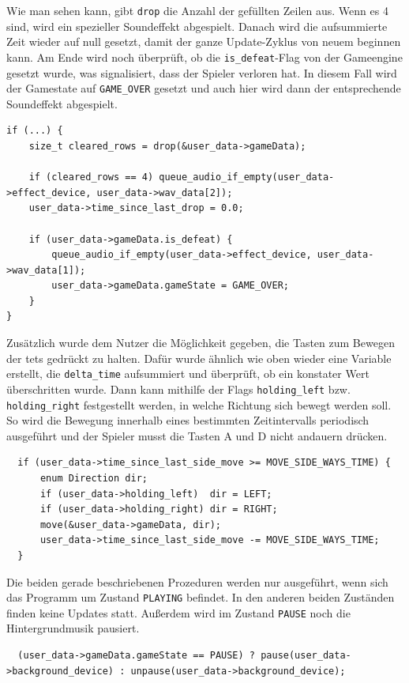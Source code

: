 \documentclass[11pt]{article}
\newcommand{\lstin}[1]{\lstinline[language=C]{#1}}
\begin{document}
Wie man sehen kann, gibt \lstin{drop} die Anzahl der gefüllten Zeilen aus. Wenn es 4 sind, wird ein spezieller Soundeffekt abgespielt.
Danach wird die aufsummierte Zeit wieder auf null gesetzt, damit der ganze Update-Zyklus von neuem beginnen kann.
Am Ende wird noch überprüft, ob die \lstin{is_defeat}-Flag von der Gameengine gesetzt wurde, 
was signalisiert, dass der Spieler verloren hat. In diesem Fall wird der Gamestate auf \lstin{GAME_OVER} 
gesetzt und auch hier wird dann der entsprechende Soundeffekt abgespielt. 

\begin{lstlisting}
if (...) {
    size_t cleared_rows = drop(&user_data->gameData);

    if (cleared_rows == 4) queue_audio_if_empty(user_data->effect_device, user_data->wav_data[2]);
    user_data->time_since_last_drop = 0.0;

    if (user_data->gameData.is_defeat) {
        queue_audio_if_empty(user_data->effect_device, user_data->wav_data[1]);
        user_data->gameData.gameState = GAME_OVER;
    }
}
\end{lstlisting}

Zusätzlich wurde dem Nutzer die Möglichkeit gegeben, die Tasten zum Bewegen der \glspl{tet} gedrückt zu halten.
Dafür wurde ähnlich wie oben wieder eine Variable erstellt, die \lstin{delta_time} 
aufsummiert und überprüft, ob ein konstater Wert überschritten wurde. 
Dann kann mithilfe der Flags \lstin{holding_left} bzw. \lstin{holding_right} festgestellt werden, 
in welche Richtung sich bewegt werden soll. So wird die Bewegung innerhalb 
eines bestimmten Zeitintervalls periodisch ausgeführt und der Spieler musst die Tasten A und D nicht andauern drücken.

\begin{lstlisting}
  if (user_data->time_since_last_side_move >= MOVE_SIDE_WAYS_TIME) {
      enum Direction dir;
      if (user_data->holding_left)  dir = LEFT;
      if (user_data->holding_right) dir = RIGHT;
      move(&user_data->gameData, dir);
      user_data->time_since_last_side_move -= MOVE_SIDE_WAYS_TIME;
  }
\end{lstlisting}
  
Die beiden gerade beschriebenen Prozeduren werden nur ausgeführt, wenn sich das Programm um Zustand \lstin{PLAYING} befindet.
In den anderen beiden Zuständen finden keine Updates statt. Außerdem wird im Zustand \lstin{PAUSE} noch die Hintergrundmusik pausiert.

\begin{lstlisting}
  (user_data->gameData.gameState == PAUSE) ? pause(user_data->background_device) : unpause(user_data->background_device);
\end{lstlisting}
\end{document}
